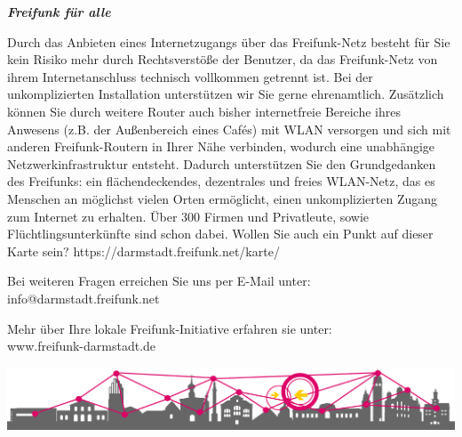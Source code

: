 \documentclass[a4paper]{article}
\begin{document}
\newpage

\thispagestyle{empty}

\begin{center}
  \Huge \textit{\textbf{\textcolor{freifunkpink}{Freifunk für alle}}} \\
  \vspace{0.6cm}
\end{center}

\begin{Row}[cellsep=0.75cm]
  \begin{Cell}{1}
      Durch das Anbieten eines Internetzugangs über das Freifunk-Netz besteht für Sie kein Risiko mehr durch Rechtsverstöße der Benutzer, da das Freifunk-Netz von ihrem Internetanschluss technisch vollkommen getrennt ist.
      Bei der unkomplizierten Installation unterstützen wir Sie gerne ehrenamtlich. Zusätzlich können Sie durch weitere Router auch bisher internetfreie Bereiche ihres Anwesens (z.B. der Außenbereich eines Cafés) mit WLAN versorgen und sich mit anderen Freifunk-Routern in Ihrer Nähe verbinden, wodurch eine unabhängige Netzwerkinfrastruktur entsteht. Dadurch unterstützen Sie den Grundgedanken des Freifunks: ein flächendeckendes, dezentrales und freies WLAN-Netz, das es Menschen an möglichst vielen Orten ermöglicht, einen unkomplizierten Zugang zum Internet zu erhalten. Über 300 Firmen und Privatleute, sowie Flüchtlingsunterkünfte sind schon dabei.
      Wollen Sie auch ein Punkt auf dieser Karte sein? https://darmstadt.freifunk.net/karte/

      \vspace{1cm}


      \begin{center}
        Bei weiteren Fragen erreichen Sie uns per E-Mail unter:\\
        info@darmstadt.freifunk.net

        \vspace{1cm}
        Mehr über Ihre lokale Freifunk-Initiative erfahren sie unter:\\
        \vspace{0.5cm}
        \large www.freifunk-darmstadt.de
      \end{center}
      \vspace{2cm}


  \end{Cell}
\end{Row}

\vspace{1.6cm}
\begin{center}
  \hspace*{-0.05 \paperwidth}\includegraphics[width=\paperwidth]{../images/footer_skyline_notext.png}
\end{center}
\end{document}
